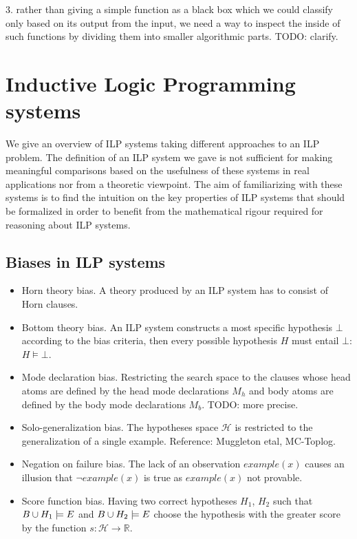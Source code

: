 3. rather than giving a simple function as a black box which we could classify only based on its output from the input, we need a way to inspect the inside of such functions by dividing them into smaller algorithmic parts.
TODO: clarify.

\section{Inductive Logic Programming systems}
We give an overview of ILP systems taking different approaches to an ILP problem. The definition of an ILP system we gave is not sufficient for making meaningful comparisons based on the usefulness of these systems in real applications nor from a theoretic viewpoint. The aim of familiarizing with these systems is to find the intuition on the key properties of ILP systems that should be formalized in order to benefit from the mathematical rigour required for reasoning about ILP systems.

\subsection{Biases in ILP systems}
\begin{itemize}
\item Horn theory bias. A theory produced by an ILP system has to consist of Horn clauses.
\item Bottom theory bias. An ILP system constructs a most specific hypothesis $\bot$ according to the bias criteria, then every possible hypothesis $H$ must entail $\bot$: $H \models \bot$.
\item Mode declaration bias. Restricting the search space to the clauses whose head atoms are defined by the head mode declarations $M_h$ and body atoms are defined by the body mode declarations $M_b$.
TODO: more precise.
\item Solo-generalization bias. The hypotheses space $\mathcal{H}$ is restricted to the generalization of a single example. Reference: Muggleton etal, MC-Toplog.
\item Negation on failure bias. The lack of an observation $example(x)$
causes an illusion that $\neg example(x)$ is true as $example(x)$ not provable.
\item Score function bias. Having two correct hypotheses $H_1$, $H_2$ such that $B \cup H_1 \models E$ and $B \cup H_2 \models E$ choose the hypothesis with the greater score by the function $s:\mathcal{H} \to \mathbb{R}$.
\end{itemize}

